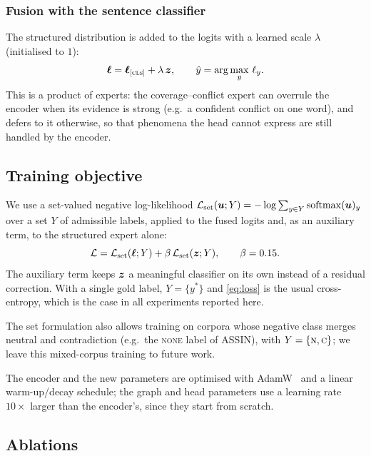 \subsubsection{Fusion with the sentence classifier}
\label{sec:fusion}

The structured distribution is added to the \cls{} logits with a learned scale $\lambda$ (initialised to
$1$):
\begin{equation}
  \bm{\ell} = \bm{\ell}_{\textsc{[cls]}} + \lambda\,\bm{z}, \qquad \hat{y}=\arg\max_{y}\,\ell_y .
  \label{eq:fusion}
\end{equation}
This is a product of experts: the coverage--conflict expert can overrule the encoder when its evidence is
strong (e.g.\ a confident conflict on one word), and defers to it otherwise, so that phenomena the head
cannot express are still handled by the encoder.

\subsection{Training objective}
\label{sec:training}

We use a set-valued negative log-likelihood
$\mathcal{L}_{\mathrm{set}}(\bm{u};Y) = -\log\sum_{y\in Y}\operatorname{softmax}(\bm{u})_y$ over a set $Y$ of admissible
labels, applied to the fused logits and, as an auxiliary term, to the structured expert alone:
\begin{equation}
  \mathcal{L} = \mathcal{L}_{\mathrm{set}}(\bm{\ell};Y) + \beta\,\mathcal{L}_{\mathrm{set}}(\bm{z};Y), \qquad \beta = 0.15 .
  \label{eq:loss}
\end{equation}
The auxiliary term keeps $\bm{z}$ a meaningful classifier on its own instead of a residual correction.
With a single gold label, $Y=\{y^{*}\}$ and \cref{eq:loss} is the usual cross-entropy, which is the case in
all experiments reported here.

The set formulation also allows training on corpora whose negative class
merges neutral and contradiction (e.g.\ the \textsc{none} label of ASSIN), with $Y=\{\textsc{n},\textsc{c}\}$; we leave
this mixed-corpus training to future work.

The encoder and the new parameters are optimised with AdamW~\citep{loshchilov2019decoupled} and a
linear warm-up/decay schedule; the graph and head parameters use a learning rate $10\times$ larger than
the encoder's, since they start from scratch.

\subsection{Ablations}
\label{sec:ablations}

